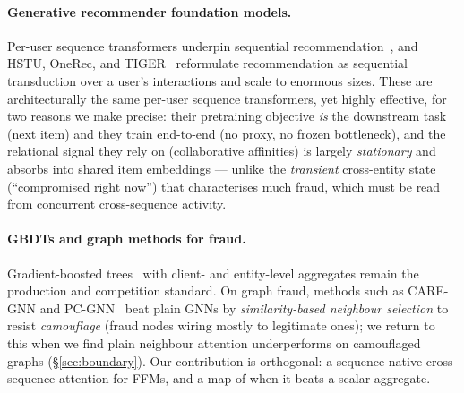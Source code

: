 \paragraph{Generative recommender foundation models.} Per-user sequence transformers underpin
sequential recommendation~\cite{kang2018sasrec,sun2019bert4rec}, and HSTU, OneRec, and
TIGER~\cite{zhai2024hstu,deng2024onerec,rajput2023tiger} reformulate
recommendation as sequential transduction over a user's interactions and scale to enormous sizes.
These are architecturally the same per-user sequence transformers, yet highly effective, for two
reasons we make precise: their pretraining objective \emph{is} the downstream task (next item) and
they train end-to-end (no proxy, no frozen bottleneck), and the relational signal they rely on
(collaborative affinities) is largely \emph{stationary} and absorbs into shared item embeddings ---
unlike the \emph{transient} cross-entity state (``compromised right now'') that characterises much
fraud, which must be read from concurrent cross-sequence activity.

\paragraph{GBDTs and graph methods for fraud.} Gradient-boosted trees~\cite{ke2017lightgbm,chen2016xgboost}
with client- and entity-level aggregates remain the production and competition standard. On graph
fraud, methods such as CARE-GNN and PC-GNN~\cite{dou2020caregnn,liu2021pcgnn} beat plain GNNs by
\emph{similarity-based neighbour selection} to
resist \emph{camouflage} (fraud nodes wiring mostly to legitimate ones); we return to this when we
find plain neighbour attention underperforms on camouflaged graphs (\S\ref{sec:boundary}). Our
contribution is orthogonal: a sequence-native cross-sequence attention for FFMs, and a map of when
it beats a scalar aggregate.
